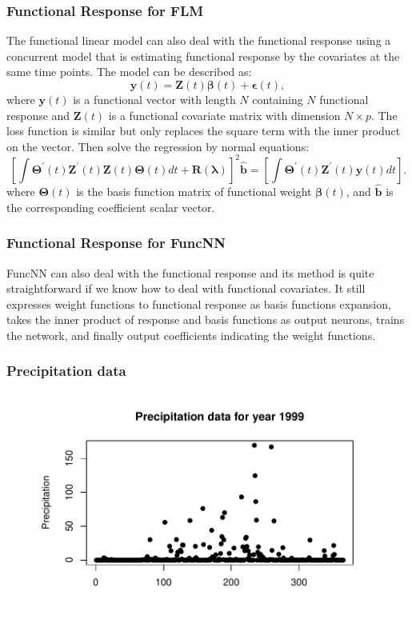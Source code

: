 \documentclass[
	9pt, %
]{beamer}
\begin{document}
\begin{frame}
	\frametitle{Functional Response for FLM}
	The functional linear model can also deal with the functional response using a concurrent model that is estimating functional response by the covariates at the same time points. The model can be described as:
	$$\bm{y}(t)=\bm{Z}\left(t\right)\bm{\beta}(t)+\bm{\epsilon}(t),$$
	where $\bm y(t)$ is a functional vector with length $N$ containing $N$ functional response and $\bm Z(t)$ is a functional covariate matrix with dimension $N\times p$. The loss function is similar but only replaces the square term with the inner product on the vector. Then solve the regression by normal equations:
	$$\left[\int{\bm{\Theta}^\prime\left(t\right)\bm{Z}^\prime\left(t\right)\bm{Z}\left(t\right)\bm{\Theta}\left(t\right)dt}+\bm{R}\left(\bm{\lambda}\right)\right]^2\hat{\bm{b}}=\left[\int{\bm{\Theta}^\prime\left(t\right)\bm{Z}^\prime\left(t\right)\bm{y}\left(t\right)dt}\right].$$
	where $\bm\Theta(t)$ is the basis function matrix of functional weight $\bm \beta(t)$, and  $\hat{\bm b}$ is the corresponding coefficient scalar vector.	
	

\end{frame}
\begin{frame}
	\frametitle{Functional Response for FuncNN}
	FuncNN can also deal with the functional response and its method is quite straightforward if we know how to deal with functional covariates. It still expresses weight functions to functional response as basis functions expansion, takes the inner product of response and basis functions as output neurons, trains the network, and finally output coefficients indicating the weight functions.	

\end{frame}
\begin{frame}
	\frametitle{Precipitation data}
	\begin{figure}[H] %
	\centering %
	\includegraphics[width=1.0\textwidth]{Prec.pdf} %
	\end{figure}
\end{frame}	
\end{document}
